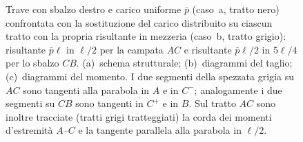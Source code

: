\begin{figure}[htbp]
{
			}
			\caption{Trave con sbalzo destro e carico uniforme $\bar p$
				(caso~a, tratto nero) confrontata con la sostituzione del carico
				distribuito su ciascun tratto con la propria risultante in
				mezzeria (caso~b, tratto grigio): risultante $\bar p\ell$ in
				$\ell/2$ per la campata $AC$ e risultante $\bar p\ell/2$ in
				$5\ell/4$ per lo sbalzo $CB$. (a)~schema strutturale; (b)~diagrammi
				del taglio; (c)~diagrammi del momento. I due segmenti della
				spezzata grigia su $AC$ sono tangenti alla parabola in $A$ e in
				$C^-$; analogamente i due segmenti su $CB$ sono tangenti in $C^+$
				e in $B$. Sul tratto $AC$ sono inoltre tracciate (tratti grigi
				tratteggiati) la corda dei momenti d'estremità $A$--$C$ e la
				tangente parallela alla parabola in $\ell/2$.}
			\label{fig:stat_sbalzo_01}
		\end{figure}
